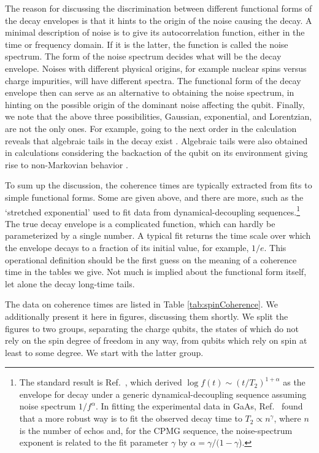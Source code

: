 \documentclass[aps, prx, showpacs, twocolumn, superscriptaddress, notitlepage, longbibliography, floatfix, nofootinbib]{revtex4-2}
\newcommand{\separate}[1]
{
 #1
}
\begin{document}
The reason for discussing the discrimination between different functional forms of the decay envelopes is that it hints to the origin of the noise causing the decay. A minimal description of noise is to give its autocorrelation function, either in the time or frequency domain. If it is the latter, the function is called the noise spectrum. The form of the noise spectrum decides what will be the decay envelope. Noises with different physical origins, for example nuclear spins versus charge impurities, will have different spectra. The functional form of the decay envelope then can serve as an alternative to obtaining the noise spectrum, in hinting on the possible origin of the dominant noise affecting the qubit. Finally, we note that the above three possibilities, Gaussian, exponential, and Lorentzian, are not the only ones. For example, going to the next order in the calculation reveals that algebraic tails in the decay exist \cite{ithier_decoherence_2005}. Algebraic tails were also obtained in calculations considering the backaction of the qubit on its environment giving rise to non-Markovian behavior \cite{fischer_dealing_2009}. 

To sum up the discussion, the coherence times are typically extracted from fits to simple functional forms. Some are given above, and there are more, such as the  `stretched exponential' used to fit data from dynamical-decoupling sequences.\footnote{The standard result is Ref.~\cite{cywinski_how_2008}, which derived $\log f(t) \sim (t/T_2)^{1+\alpha}$ as the envelope for decay under a generic dynamical-decoupling sequence assuming noise spectrum $1/f^\alpha$. In fitting the experimental data in GaAs, Ref.~\cite{medford_scaling_2012} found that a more robust way is to fit the observed decay time to $T_2 \propto n^\gamma$, where $n$ is the number of echos and, for the CPMG sequence, the noise-spectrum exponent is related to the fit parameter $\gamma$ by $\alpha=\gamma/(1-\gamma$).} The true decay envelope is a complicated function, which can hardly be parameterized by a single number. A typical fit returns the time scale over which the envelope decays to a fraction of its initial value, for example, $1/e$. This operational definition should be the first guess on the meaning of a coherence time in the tables we give. Not much is implied about the functional form itself, let alone the decay long-time tails. 

\separate{The data on coherence times are listed in 
Table \ref{tab:spinCoherence}. 
We additionally present it here in figures, discussing them shortly. We split the figures to two groups, separating the charge qubits, the states of which do not rely on the spin degree of freedom in any way, from qubits which rely on spin at least to some degree. We start with the latter group.}
\end{document}
